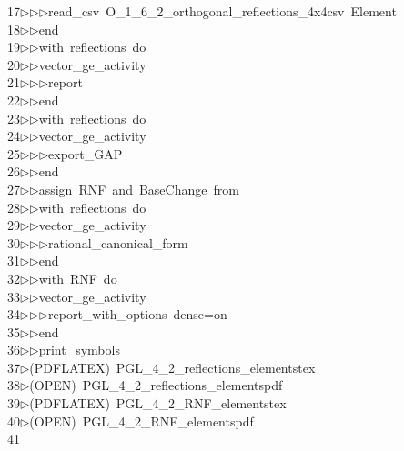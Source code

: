 \begin{tabbing}
17\>$\triangleright$\>$\triangleright$\>$\triangleright$\>read\_csv\ O\_1\_6\_2\_orthogonal\_reflections\_4x4csv\ Element\ \\[0pt]
18\>$\triangleright$\>$\triangleright$\>end\ \\[0pt]
19\>$\triangleright$\>$\triangleright$\>with\ reflections\ do\ \\[0pt]
20\>$\triangleright$\>$\triangleright$\>vector\_ge\_activity\ \\[0pt]
21\>$\triangleright$\>$\triangleright$\>$\triangleright$\>report\ \\[0pt]
22\>$\triangleright$\>$\triangleright$\>end\ \\[0pt]
23\>$\triangleright$\>$\triangleright$\>with\ reflections\ do\ \\[0pt]
24\>$\triangleright$\>$\triangleright$\>vector\_ge\_activity\ \\[0pt]
25\>$\triangleright$\>$\triangleright$\>$\triangleright$\>export\_GAP\ \\[0pt]
26\>$\triangleright$\>$\triangleright$\>end\ \\[0pt]
27\>$\triangleright$\>$\triangleright$\>assign\ RNF\ and\ BaseChange\ from\ \\[0pt]
28\>$\triangleright$\>$\triangleright$\>with\ reflections\ do\ \\[0pt]
29\>$\triangleright$\>$\triangleright$\>vector\_ge\_activity\ \\[0pt]
30\>$\triangleright$\>$\triangleright$\>$\triangleright$\>rational\_canonical\_form\ \\[0pt]
31\>$\triangleright$\>$\triangleright$\>end\ \\[0pt]
32\>$\triangleright$\>$\triangleright$\>with\ RNF\ do\ \\[0pt]
33\>$\triangleright$\>$\triangleright$\>vector\_ge\_activity\ \\[0pt]
34\>$\triangleright$\>$\triangleright$\>$\triangleright$\>report\_with\_options\ dense=on\ \\[0pt]
35\>$\triangleright$\>$\triangleright$\>end\ \\[0pt]
36\>$\triangleright$\>$\triangleright$\>print\_symbols\\[0pt]
37\>$\triangleright$\>(PDFLATEX)\ PGL\_4\_2\_reflections\_elementstex\\[0pt]
38\>$\triangleright$\>(OPEN)\ PGL\_4\_2\_reflections\_elementspdf\\[0pt]
39\>$\triangleright$\>(PDFLATEX)\ PGL\_4\_2\_RNF\_elementstex\\[0pt]
40\>$\triangleright$\>(OPEN)\ PGL\_4\_2\_RNF\_elementspdf\\[0pt]
41\>\end{tabbing}
